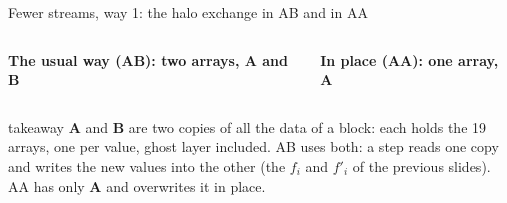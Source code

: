 \documentclass[aspectratio=169,10pt,t]{beamer}
\newcommand{\takeaway}[1]{\par\vfill
  \begin{beamercolorbox}[wd=\textwidth,sep=4pt,rounded=true]{takeaway}
    \small #1
  \end{beamercolorbox}}
\begin{document}

\begin{frame}{Fewer streams, way 1: the halo exchange in AB and in AA}
  \vspace{0mm}
  \begin{columns}[T,onlytextwidth]
    {\small\bfseries The usual way (AB): two arrays, A and B\par}
    \vspace{1mm}
    \centering
    \par
    \vspace{1mm}
    \par
    {\small\bfseries In place (AA): one array, A\par}
    \vspace{1mm}
    \centering
    \par
    \vspace{1mm}
    \par
  \end{columns}
  \vspace{-1mm}
  \centering\halolegend\par
  \takeaway{\textbf{A} and \textbf{B} are two copies of all the data of a block: each holds the 19 arrays, one per
    value, ghost layer included. AB uses both: a step reads one copy and writes the new values into the other
    (the $f_i$ and $f'_i$ of the previous slides). AA has only \textbf{A} and overwrites it in place.}
\end{frame}
\end{document}
